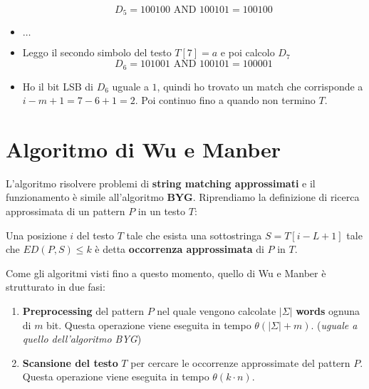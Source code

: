 \begin{esempio}
\begin{itemize}
              \begin{equation}
                  D_5 = 100100 \text{ AND } 100101 = 100100
              \end{equation}
        \item $\dots$
        \item Leggo il secondo simbolo del testo $T[7] = a$ e poi calcolo $D_7$
              \begin{equation}
                  D_6 = 101001 \text{ AND } 100101 = 100001
              \end{equation}
        \item Ho il bit LSB di $D_6$ uguale a $1$, quindi ho trovato un match che
              corrisponde a $i - m + 1 = 7 - 6 + 1 = 2$. Poi continuo fino a
              quando non termino $T$.
    \end{itemize}
\end{esempio}
\section{Algoritmo di Wu e Manber}
L'algoritmo risolvere problemi di \textbf{string matching approssimati} e il
funzionamento è simile all'algoritmo \textbf{BYG}.
Riprendiamo la definizione di ricerca approssimata di un pattern $P$ in un testo
$T$:
\begin{definizione}
    Una posizione $i$ del testo $T$ tale che esista una sottostringa $S = T[i -
                L + 1]$ tale che $ED(P, S) \leq k$ è detta \textbf{occorrenza
        approssimata} di $P$ in $T$.
\end{definizione}
Come gli algoritmi visti fino a questo momento, quello di Wu e Manber è
strutturato in due fasi:
\begin{enumerate}
    \item \textbf{Preprocessing} del pattern $P$ nel quale vengono calcolate
          $|\Sigma|$ \textbf{words} ognuna di $m$ bit. Questa operazione viene
          eseguita in tempo $\theta(|\Sigma| + m)$. (\textit{uguale a quello
              dell'algoritmo BYG})
    \item \textbf{Scansione del testo} $T$ per cercare le occorrenze approssimate
          del pattern $P$. Questa operazione viene eseguita in tempo
          $\theta(k \cdot n)$.
\end{enumerate}
